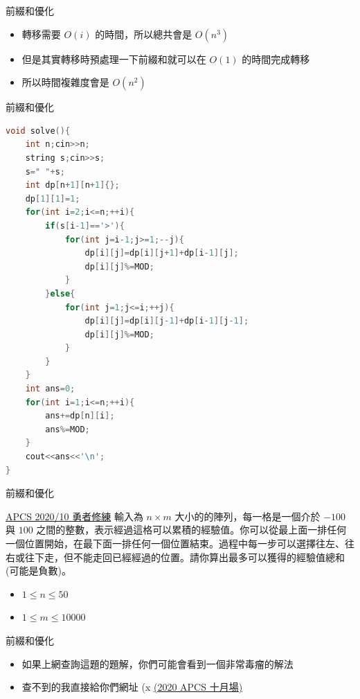 \documentclass[aspectratio=169]{beamer}
\begin{document}
    \begin{frame}{前綴和優化}
        \begin{itemize}
            \item 轉移需要 $O(i)$ 的時間，所以總共會是 $O(n^3)$
            \item 但是其實轉移時預處理一下前綴和就可以在 $O(1)$ 的時間完成轉移
            \item 所以時間複雜度會是 $O(n^2)$
        \end{itemize}
    \end{frame}

    \begin{frame}[fragile]{前綴和優化}
        \begin{lstlisting}[language=C++, basicstyle=\ttfamily\tiny]
void solve(){
    int n;cin>>n;
    string s;cin>>s;
    s=" "+s;
    int dp[n+1][n+1]{};
    dp[1][1]=1;
    for(int i=2;i<=n;++i){
        if(s[i-1]=='>'){
            for(int j=i-1;j>=1;--j){
                dp[i][j]=dp[i][j+1]+dp[i-1][j];
                dp[i][j]%=MOD;
            }
        }else{
            for(int j=1;j<=i;++j){
                dp[i][j]=dp[i][j-1]+dp[i-1][j-1];
                dp[i][j]%=MOD;
            }
        }
    }
    int ans=0;
    for(int i=1;i<=n;++i){
        ans+=dp[n][i];
        ans%=MOD;
    }
    cout<<ans<<'\n';
}
        \end{lstlisting}
    \end{frame}
    
    \begin{frame}{前綴和優化}
        \begin{block}{\href{https://zerojudge.tw/ShowProblem?problemid=f314}{APCS 2020/10 勇者修練}}
        輸入為 $n \times m$ 大小的的陣列，每一格是一個介於 $-100$ 與 $100$ 之間的整數，表示經過這格可以累積的經驗值。你可以從最上面一排任何一個位置開始，在最下面一排任何一個位置結束。過程中每一步可以選擇往左、往右或往下走，但不能走回已經經過的位置。請你算出最多可以獲得的經驗值總和(可能是負數)。 
        \begin{itemize}
            \item $1 \le n \le 50$
            \item $1 \le m \le 10000$
        \end{itemize}
        \end{block}
    \end{frame}

    \begin{frame}{前綴和優化}
        \begin{itemize}
            \item 如果上網查詢這題的題解，你們可能會看到一個非常毒瘤的解法
            \item 查不到的我直接給你們網址 (x \href{https://sam571128.codes/2020/10/17/APCS-10-17/}{(2020 APCS 十月場)}
        \end{itemize}
    \end{frame}
\end{document}
